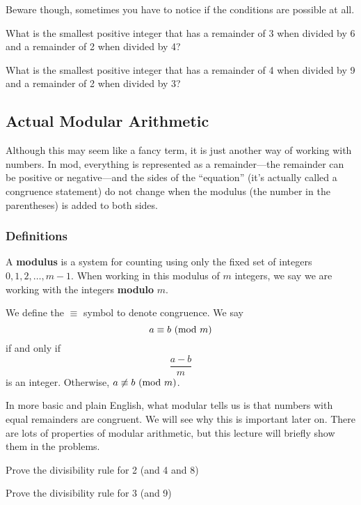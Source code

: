 				Beware though, sometimes you have to notice if the conditions are possible at all. \par
				\begin{problem} What is the smallest positive integer that has a remainder of 3 when divided by 6 and a remainder of 2 when divided by 4? \end{problem}\vspace{0.5in}
				\begin{problem} What is the smallest positive integer that has a remainder of 4 when divided by 9 and a remainder of 2 when divided by 3? \end{problem}\vspace{0.5in}
				\clearpage
		\subsection{Actual Modular Arithmetic}
			Although this may seem like a fancy term, it is just another way of working with numbers. In mod, everything is represented as a remainder---the remainder can be positive or negative---and the sides of the ``equation'' (it's actually called a congruence statement) do not change when the modulus (the number in the parentheses) is added to both sides.
			\subsubsection{Definitions}
			A \textbf{modulus} is a system for counting using only the fixed set of integers $0, 1, 2,\ldots,m-1$. When working in this modulus of $m$ integers, we say we are working with the integers \textbf{modulo} $m$. \par
			We define the $\equiv$ symbol to denote congruence. We say 
			$$a \equiv b \ (\text{mod}\ m)$$
			if and only if 
			$$\frac{a-b}{m}$$
			is an integer. Otherwise, $a \not\equiv b \ (\text{mod}\ m)$. \par
			In more basic and plain English, what modular tells us is that numbers with equal remainders are congruent. We will see why this is important later on. There are lots of properties of modular arithmetic, but this lecture will briefly show them in the problems.
			\begin{problem} Prove the divisibility rule for 2 (and 4 and 8)\end{problem} \vspace{1in}
			\begin{problem} Prove the divisibility rule for 3 (and 9)\end{problem} \vspace{2in}
			
